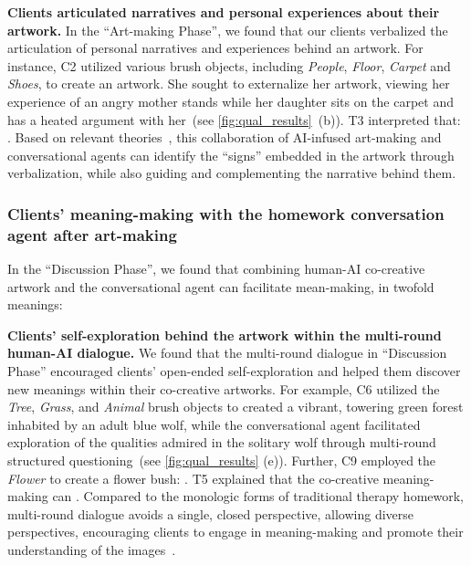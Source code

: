 \textbf{Clients articulated narratives and personal experiences about their artwork.}
In the ``Art-making Phase'', we found that our clients verbalized the articulation of personal narratives and experiences behind an artwork.
For instance, C2 utilized various brush objects, including \textit{People}, \textit{Floor}, \textit{Carpet} and \textit{Shoes}, to create an artwork.
She sought to externalize her artwork, viewing her experience of an angry mother stands while her daughter sits on the carpet and has a heated argument with her~(see \autoref{fig:qual_results}~(b)).
T3 interpreted that: .
Based on relevant theories~\cite{carlson1997using,harpaz2014narrative}, this collaboration of AI-infused art-making and conversational agents can identify the ``signs'' embedded in the artwork through verbalization, while also guiding and complementing the narrative behind them.

\subsubsection{\textbf{Clients' meaning-making with the homework conversation agent after art-making}}
In the ``Discussion Phase'', we found that combining human-AI co-creative artwork and the conversational agent can facilitate mean-making, in twofold meanings:

\textbf{Clients' self-exploration behind the artwork within the multi-round human-AI dialogue.} 
We found that the multi-round dialogue in ``Discussion Phase'' encouraged clients' open-ended self-exploration and helped them discover new meanings within their co-creative artworks. 
For example, C6 utilized the \textit{Tree}, \textit{Grass}, and \textit{Animal} brush objects to created a vibrant, towering green forest inhabited by an adult blue wolf, while the conversational agent facilitated exploration of the qualities admired in the solitary wolf through multi-round structured questioning~(see \autoref{fig:qual_results} (e)).
Further, C9 employed the \textit{Flower} to create a flower bush: .
T5 explained that the co-creative meaning-making can .
Compared to the monologic forms of traditional therapy homework, multi-round dialogue avoids a single, closed perspective, allowing diverse perspectives, encouraging clients to engage in meaning-making and promote their understanding of the images~\cite{bacstemur2021integration,pare2004willow}.

